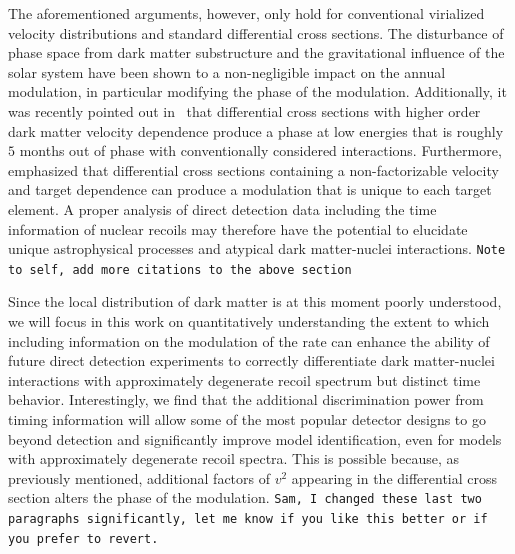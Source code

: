 \documentclass[11pt]{article}
\newcommand{\sjwColor}{red}
\newcommand{\sjwtt}[1]{{\color{\sjwColor}\tt #1}}
\begin{document}
The aforementioned arguments, however, only hold for conventional virialized velocity distributions and standard differential cross sections. The disturbance of phase space from dark matter substructure \cite{Green:2000ga,Gelmini:2000dm,DelNobile:2015nua} and the gravitational influence of the solar system \cite{Lee:2013wza,DelNobile:2015nua} have been shown to a non-negligible impact on the annual modulation, in particular modifying the phase of the modulation. Additionally, it was recently pointed out in~\cite{DelNobile:2015tza,DelNobile:2015rmp} that differential cross sections with higher order dark matter velocity dependence produce a phase at low energies that is roughly $5$ months out of phase with conventionally considered interactions. Furthermore, \cite{DelNobile:2015tza,DelNobile:2015rmp} emphasized that differential cross sections containing a non-factorizable velocity and target dependence can produce a modulation that is unique to each target element. A proper analysis of direct detection data including the time information of nuclear recoils may therefore have the potential to elucidate unique astrophysical processes and atypical dark matter-nuclei interactions. \sjwtt{Note to self, add more citations to the above section}  


Since the local distribution of dark matter is at this moment poorly understood, we will focus in this work on quantitatively understanding the extent to which including information on the modulation of the rate can enhance the ability of future direct detection experiments to correctly differentiate dark matter-nuclei interactions with approximately degenerate recoil spectrum but distinct time behavior. Interestingly, we find that the additional discrimination power from timing information will allow some of the most popular detector designs to go beyond detection and significantly improve model identification, even for models with approximately degenerate recoil spectra.  This is possible because, as previously mentioned, additional factors of $v^2$ appearing in the differential cross section alters the phase of the modulation. %
\sjwtt{Sam, I changed these last two paragraphs significantly, let me know if you like this better or if you prefer to revert.}
\end{document}
